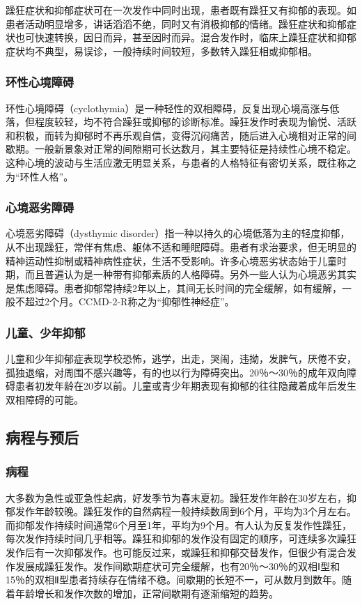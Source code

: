 躁狂症状和抑郁症状可在一次发作中同时出现，患者既有躁狂又有抑郁的表现。如患者活动明显增多，讲话滔滔不绝，同时又有消极抑郁的情绪。躁狂症状和抑郁症状也可快速转换，因日而异，甚至因时而异。混合发作时，临床上躁狂症状和抑郁症状均不典型，易误诊，一般持续时间较短，多数转入躁狂相或抑郁相。

\subsubsection{环性心境障碍}

环性心境障碍（cyclothymia）是一种轻性的双相障碍，反复出现心境高涨与低落，但程度较轻，均不符合躁狂或抑郁的诊断标准。躁狂发作时表现为愉悦、活跃和积极，而转为抑郁时不再乐观自信，变得沉闷痛苦，随后进入心境相对正常的间歇期。一般新景象对正常的间隙期可长达数月，其主要特征是持续性心境不稳定。这种心境的波动与生活应激无明显关系，与患者的人格特征有密切关系，既往称之为``环性人格''。

\subsubsection{心境恶劣障碍}

心境恶劣障碍（dysthymic
disorder）指一种以持久的心境低落为主的轻度抑郁，从不出现躁狂，常伴有焦虑、躯体不适和睡眠障碍。患者有求治要求，但无明显的精神运动性抑制或精神病性症状，生活不受影响。许多心境恶劣状态始于儿童时期，而且普遍认为是一种带有抑郁素质的人格障碍。另外一些人认为心境恶劣其实是焦虑障碍。患者抑郁常持续2年以上，其间无长时间的完全缓解，如有缓解，一般不超过2个月。CCMD-2-R称之为``抑郁性神经症''。

\subsubsection{儿童、少年抑郁}

儿童和少年抑郁症表现学校恐怖，逃学，出走，哭闹，违拗，发脾气，厌倦不安，孤独退缩，对周围不感兴趣等，有的也以行为障碍突出。20％～30％的成年双向障碍患者初发年龄在20岁以前。儿童或青少年期表现有抑郁的往往隐藏着成年后发生双相障碍的可能。

\subsection{病程与预后}

\subsubsection{病程}

大多数为急性或亚急性起病，好发季节为春末夏初。躁狂发作年龄在30岁左右，抑郁发作年龄较晚。躁狂发作的自然病程一般持续数周到6个月，平均为3个月左右。而抑郁发作持续时间通常6个月至1年，平均为9个月。有人认为反复发作性躁狂，每次发作持续时间几乎相等。躁狂和抑郁的发作没有固定的顺序，可连续多次躁狂发作后有一次抑郁发作。也可能反过来，或躁狂和抑郁交替发作，但很少有混合发作发展成躁狂发作。发作间歇期症状可完全缓解，也有20％～30％的双相Ⅰ型和15％的双相Ⅱ型患者持续存在情绪不稳。间歇期的长短不一，可从数月到数年。随着年龄增长和发作次数的增加，正常间歇期有逐渐缩短的趋势。

